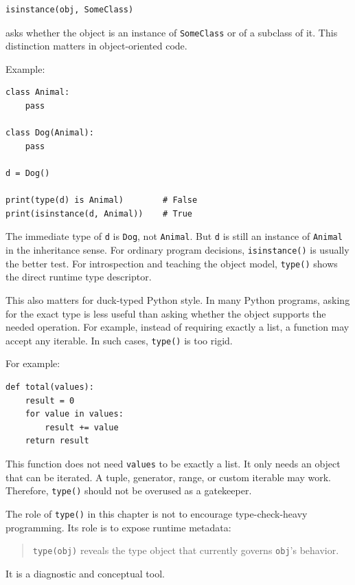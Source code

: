 \begin{verbatim}
isinstance(obj, SomeClass)
\end{verbatim}

asks whether the object is an instance of \texttt{SomeClass} or of a subclass of it. This distinction matters in object-oriented code.

Example:

\begin{verbatim}
class Animal:
    pass

class Dog(Animal):
    pass

d = Dog()

print(type(d) is Animal)        # False
print(isinstance(d, Animal))    # True
\end{verbatim}

The immediate type of \texttt{d} is \texttt{Dog}, not \texttt{Animal}. But \texttt{d} is still an instance of \texttt{Animal} in the inheritance sense. For ordinary program decisions, \texttt{isinstance()} is usually the better test. For introspection and teaching the object model, \texttt{type()} shows the direct runtime type descriptor.

This also matters for duck-typed Python style. In many Python programs, asking for the exact type is less useful than asking whether the object supports the needed operation. For example, instead of requiring exactly a list, a function may accept any iterable. In such cases, \texttt{type()} is too rigid.

For example:

\begin{verbatim}
def total(values):
    result = 0
    for value in values:
        result += value
    return result
\end{verbatim}

This function does not need \texttt{values} to be exactly a list. It only needs an object that can be iterated. A tuple, generator, range, or custom iterable may work. Therefore, \texttt{type()} should not be overused as a gatekeeper.

The role of \texttt{type()} in this chapter is not to encourage type-check-heavy programming. Its role is to expose runtime metadata:

\begin{quote}
\texttt{type(obj)} reveals the type object that currently governs \texttt{obj}'s behavior.
\end{quote}

It is a diagnostic and conceptual tool.

